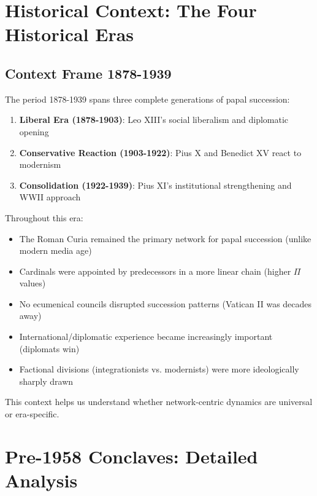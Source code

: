 \documentclass[11pt,a4paper]{article}
\begin{document}
\section{Historical Context: The Four Historical Eras}

\subsection{Context Frame 1878-1939}

The period 1878-1939 spans three complete generations of papal succession:

\begin{enumerate}
    \item \textbf{Liberal Era (1878-1903)}: Leo XIII's social liberalism and diplomatic opening
    \item \textbf{Conservative Reaction (1903-1922)}: Pius X and Benedict XV react to modernism
    \item \textbf{Consolidation (1922-1939)}: Pius XI's institutional strengthening and WWII approach
\end{enumerate}

Throughout this era:
\begin{itemize}
    \item The Roman Curia remained the primary network for papal succession (unlike modern media age)
    \item Cardinals were appointed by predecessors in a more linear chain (higher $\Pi$ values)
    \item No ecumenical councils disrupted succession patterns (Vatican II was decades away)
    \item International/diplomatic experience became increasingly important (diplomats win)
    \item Factional divisions (integrationists vs. modernists) were more ideologically sharply drawn
\end{itemize}

This context helps us understand whether network-centric dynamics are universal or era-specific.


\section{Pre-1958 Conclaves: Detailed Analysis}
\end{document}
